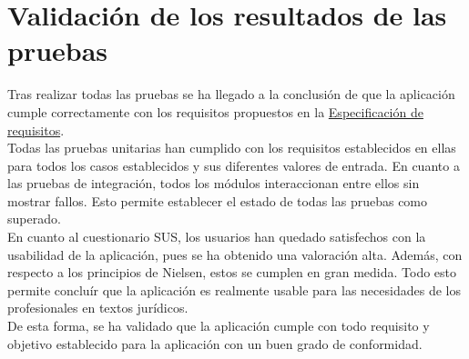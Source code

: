 \section{Validación de los resultados de las pruebas}

Tras realizar todas las pruebas se ha llegado a la conclusión de que la aplicación cumple correctamente con los requisitos propuestos en la \hyperref[enlaceespecificacion]{Especificación de requisitos}.
\\

Todas las pruebas unitarias han cumplido con los requisitos establecidos en ellas para todos los casos establecidos y sus diferentes valores de entrada. En cuanto a las pruebas de integración, todos los módulos interaccionan entre ellos sin mostrar fallos. Esto permite establecer el estado de todas las pruebas como superado.
\\

En cuanto al cuestionario SUS, los usuarios han quedado satisfechos con la usabilidad de la aplicación, pues se ha obtenido una valoración alta. Además, con respecto a los principios de Nielsen, estos se cumplen en gran medida. Todo esto permite concluír que la aplicación es realmente usable para las necesidades de los profesionales en textos jurídicos.
\\

De esta forma, se ha validado que la aplicación cumple con todo requisito y objetivo establecido para la aplicación con un buen grado de conformidad.